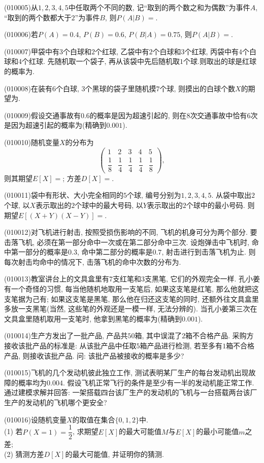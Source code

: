 \item (010005)从$1,2,3,4,5$中任取两个不同的数, 记``取到的两个数之和为偶数''为事件$A$, ``取到的两个数都大于$2$''为事件$B$, 则$P(A|B)=$.
\item (010006)若$P(A)=0.4$, $P(B)=0.6$, $P(B|A)=0.75$, 则$P(A|B)=$.
\item (010007)甲袋中有$3$个白球和$2$个红球, 乙袋中有$2$个白球和$3$个红球, 丙袋中有$4$个白球和$4$个红球. 先随机取一个袋子, 再从该袋中先后随机取$1$个球.则取出的球是红球的概率为.
\item (010008)在装有$6$个白球, $3$个黑球的袋子里随机摸$7$个球, 则摸出的白球个数$X$的期望为.
\item (010009)假设交通事故有$0.6$的概率是因为超速引起的, 则在$8$次交通事故中恰有$6$次是因为超速引起的概率为(精确到$0.001$).
\item (010010)随机变量$X$的分布为
\[\begin{pmatrix} 1 & 2 & 3 & 4 & 5 \\ \dfrac 18 & \dfrac 14 & \dfrac 14 & \dfrac 14 & \dfrac 18\end{pmatrix},\]
则其期望$E[X]=$; 方差$D[X]=$.
\item (010011)袋中有形状、大小完全相同的$5$个球, 编号分别为$1,2,3,4,5$. 从袋中取出$2$个球, 以$X$表示取出的$2$个球中的最大号码, 以$Y$表示取出的$2$个球中的最小号码. 则期望$E[(X+Y)(X-Y)]=$.
\item (010012)对飞机进行射击, 按照受损伤影响的不同, 飞机的机身可分为两个部分. 要击落飞机, 必须在第一部分命中一次或在第二部分命中三次. 设炮弹击中飞机时, 命中第一部分的概率是$0.3$, 命中第二部分的概率是$0.7$, 射击进行到击落飞机为止. 则每次射击均命中的情况下, 击落飞机的命中次数的分布为.
\item (010013)教室讲台上的文具盒里有$7$支红笔和$3$支黑笔, 它们的外观完全一样. 孔小姜有一个奇怪的习惯, 每当他随机地取用一支笔后, 如果这支笔是红笔, 那么他就把这支笔据为己有; 如果这支笔是黑笔, 那么他在归还这支笔的同时, 还额外往文具盒里多放一支黑笔(当然, 这些笔的外观还是一模一样, 无法分辨的). 当孔小姜第三次在文具盒里随机取用一支笔时, 他拿到黑笔的概率为(精确到$0.001$).
\item (010014)生产方发出了一批产品, 产品共$50$箱, 其中误混了$2$箱不合格产品. 采购方接收该批产品的标准是: 从该批产品中任取$5$箱产品进行检测, 若至多有$1$箱不合格产品, 则接收该批产品. 问: 该批产品被接收的概率是多少?
\item (010015)飞机的几个发动机彼此独立工作, 测试表明某厂生产的每台发动机出现故障的概率均为$0.004$. 假设飞机正常飞行的条件是至少有一半的发动机能正常工作. 通过建模求解并回答: 一架搭载四台该厂生产的发动机的飞机与一台搭载两台该厂生产的发动机的飞机哪个更安全?
\item (010016)设随机变量$X$的取值在集合$\{0,1,2\}$中.\\
(1) 若$P(X=1)=\dfrac 12$, 求期望$E[X]$的最大可能值$M$与$E[X]$的最小可能值$m$之差;\\
(2) 猜测方差$D[X]$的最大可能值, 并证明你的猜测.
